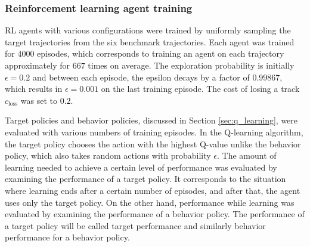 \documentclass[english, 12pt, a4paper, elec, utf8, a-1b, online]{aaltothesis}
\newcommand{\closs}{c_\text{loss}}
\begin{document}
\subsubsection{Reinforcement learning agent training}\label{sec:training}

RL agents with various configurations were trained by uniformly sampling the target trajectories from the six benchmark trajectories.
Each agent was trained for $4000$ episodes, which corresponds to training an agent on each trajectory approximately for $667$ times on average.
The exploration probability is initially $\epsilon=0.2$ and between each episode, the epsilon decays by a factor of $0.99867$, which results in $\epsilon=0.001$ on the last training episode.
The cost of losing a track $\closs$ was set to $0.2$.

Target policies and behavior policies, discussed in Section \ref{sec:q_learning}, were evaluated with various numbers of training episodes.
In the Q-learning algorithm, the target policy chooses the action with the highest Q-value unlike the behavior policy, which also takes random actions with probability $\epsilon$.
The amount of learning needed to achieve a certain level of performance was evaluated by examining the performance of a target policy.
It corresponds to the situation where learning ends after a certain number of episodes, and after that, the agent uses only the target policy.
On the other hand, performance while learning was evaluated by examining the performance of a behavior policy.
The performance of a target policy will be called target performance and similarly behavior performance for a behavior policy.
\end{document}
